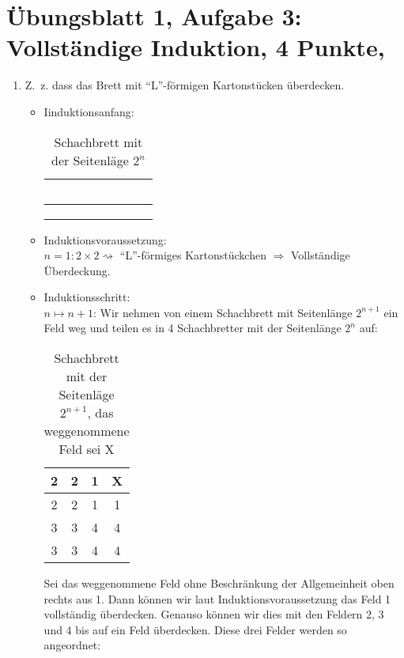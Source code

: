 \documentclass[12pt,a4paper]{report}
\begin{document}
\section{Übungsblatt 1, Aufgabe 3: Vollständige Induktion, 4 Punkte, \GruppeA}

	\begin{enumerate}
		\item Z.~z. dass das Brett mit \enquote{L}-förmigen Kartonstücken überdecken.
		\begin{itemize}
			\item Iinduktionsanfang:
				\begin{table}[H]
					\centering
					\begin{tabular}{|c|c|c|c|}
						\hline
						~~&~~&~~&~~\\
						\hline
						&&&\\
						\hline
						&&&\\
						\hline
						&&&\\
						\hline
					\end{tabular}
					\caption{Schachbrett mit der Seitenläge $2^n$}
				\end{table}
			\item Induktionsvoraussetzung:\\
			$n=1: 2 \times 2 \rightsquigarrow$ \enquote{L}-förmiges Kartonstückchen $\Rightarrow$ Vollständige Überdeckung.
			
			\item Induktionsschritt:\\
			$n\mapsto n+1$: Wir nehmen von einem Schachbrett mit Seitenlänge $2^{n+1}$ ein Feld weg und teilen es in 4 Schachbretter mit der Seitenlänge $2^n$ auf:
			\begin{table}[H]
				\centering
				\begin{tabular}{|c|c||c|c|}
					\hline
					2 & 2 & 1 & X \\
					\hline
					2 & 2 & 1 & 1 \\
					\hline
					\hline
					3 & 3 & 4 & 4 \\
					\hline
					3 & 3 & 4 & 4 \\
					\hline
				\end{tabular}
				\caption{Schachbrett mit der Seitenläge $2^{n+1} $, das weggenommene Feld sei X}
			\end{table}
			Sei das weggenommene Feld ohne Beschränkung der Allgemeinheit oben rechts aus 1. Dann können wir laut Induktionsvoraussetzung das Feld 1 vollständig überdecken. Genauso können wir dies mit den Feldern 2, 3 und 4 bis auf ein Feld überdecken. Diese drei Felder werden so angeordnet:
			

\end{itemize}
\end{enumerate}
\end{document}

